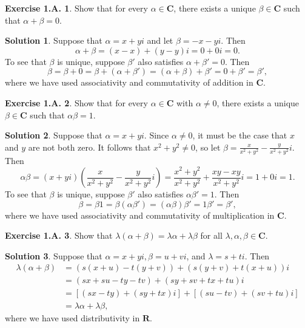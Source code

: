 \documentclass[12pt]{article}
\theoremstyle{definition}
\theoremstyle{exercise}
\newtheorem{exercise}{Exercise 1.A.}
\theoremstyle{solution}
\newtheorem*{solution}{Solution}
\newcommand{\R}{\mathbf{R}}
\newcommand{\C}{\mathbf{C}}
\begin{document}
\begin{exercise}
\label{ex:7}
    Show that for every \( \alpha \in \C \), there exists a unique \( \beta \in \C \) such that \( \alpha + \beta = 0 \).
\end{exercise}

\begin{solution}
    Suppose that \( \alpha = x + yi \) and let \( \beta = -x - yi \). Then
    \[
        \alpha + \beta = (x - x) + (y - y)i = 0 + 0i = 0.
    \]
    To see that \( \beta \) is unique, suppose \( \beta' \) also satisfies \( \alpha + \beta' = 0 \). Then
    \[
        \beta = \beta + 0 = \beta + (\alpha + \beta') = (\alpha + \beta) + \beta' = 0 + \beta' = \beta',
    \]
    where we have used associativity and commutativity of addition in \( \C \).
\end{solution}

\begin{exercise}
\label{ex:8}
    Show that for every \( \alpha \in \C \) with \( \alpha \neq 0 \), there exists a unique \( \beta \in \C \) such that \( \alpha \beta = 1 \).
\end{exercise}

\begin{solution}
    Suppose that \( \alpha = x + yi \). Since \( \alpha \neq 0 \), it must be the case that \( x \) and \( y \) are not both zero. It follows that \( x^2 + y^2 \neq 0 \), so let \( \beta = \tfrac{x}{x^2 + y^2} - \tfrac{y}{x^2 + y^2} i \). Then
    \[
        \alpha \beta = (x + yi)\left( \frac{x}{x^2 + y^2} - \frac{y}{x^2 + y^2} i \right) = \frac{x^2 + y^2}{x^2 + y^2} + \frac{xy - xy}{x^2 + y^2} i = 1 + 0i = 1.
    \]
    To see that \( \beta \) is unique, suppose \( \beta' \) also satisfies \( \alpha \beta' = 1 \). Then
    \[
        \beta = \beta 1 = \beta (\alpha \beta') = (\alpha \beta) \beta' = 1 \beta' = \beta',
    \]
    where we have used associativity and commutativity of multiplication in \( \C \).
\end{solution}

\begin{exercise}
\label{ex:9}
    Show that \( \lambda (\alpha + \beta) = \lambda \alpha + \lambda \beta \) for all \( \lambda, \alpha, \beta \in \C \).
\end{exercise}

\begin{solution}
    Suppose that \( \alpha = x + yi, \beta = u + vi \), and \( \lambda = s + ti \). Then
    \begin{align*}
        \lambda (\alpha + \beta) &= (s(x + u) - t(y + v)) + (s(y + v) + t(x + u)) i \\
        &= (sx + su - ty - tv) + (sy + sv + tx + tu) i \\
        &= [(sx - ty) + (sy + tx)i] + [(su - tv) + (sv + tu)i] \\
        &= \lambda \alpha + \lambda \beta,
    \end{align*}
    where we have used distributivity in \( \R \).
\end{solution}
\end{document}
